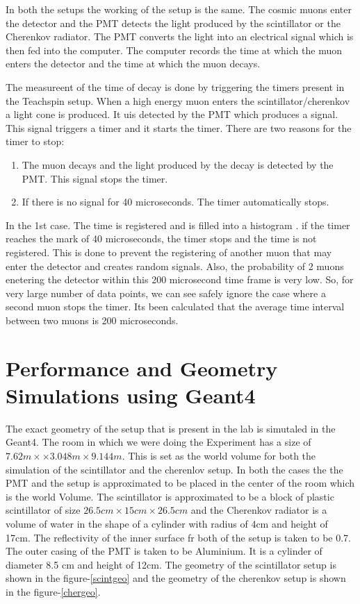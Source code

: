 \documentclass{article}
\begin{document}
\begin{multicols}{2}
In both the setups the working of the setup is the same. The cosmic muons enter the detector and the PMT detects the light produced by the scintillator or the Cherenkov radiator. The PMT converts the light into an electrical signal which is then fed into the computer. The computer records the time at which the muon enters the detector and the time at which the muon decays.

The measureent of the time of decay is done by triggering the timers present in the Teachspin setup. When a high energy muon enters the scintillator/cherenkov a light cone is produced. It uis detected by the PMT which produces a signal. This signal triggers a timer and it starts the timer. There are two reasons for the timer to stop:
\begin{enumerate}
    \item The muon decays and the light produced by the decay is detected by the PMT. This signal stops the timer.
    \item If there is no signal for 40 microseconds. The timer automatically stops.
\end{enumerate}

In the 1st case. The time is registered and is filled into a histogram . if the timer reaches the mark of 40 microseconds, the timer stops and the time is not registered. This is done to prevent the registering of another muon that may enter the detector and creates random signals.
Also, the probability of 2 muons enetering the detector within this 200 microsecond time frame is very low. So, for very large number of data points, we can see safely ignore the case where a second muon stops the timer. Its been calculated that the average time interval between two muons is 200 microseconds.

\section{\label{simobs}Performance and Geometry Simulations using Geant4}

The exact geometry of the setup that is present in the lab is simutaled in the Geant4. The room in which we were doing the Experiment has a size of $7.62m\times\times 3.048m \times 9.144m$. This is set as the world volume for both the simulation of the scintillator and the cherenlov setup. In both the cases the the PMT and the setup is approximated to be placed in the center of the room which is the world Volume. The scintillator is approximated to be a block of plastic scintillator of size $26.5cm \times 15cm \times 26.5cm$ and the Cherenkov radiator is a volume of water in the shape of a cylinder with radius of 4cm and height of 17cm. The reflectivity of the inner surface fr both of the setup is taken to be 0.7. The outer casing of the PMT is taken to be Aluminium. It is a cylinder of diameter 8.5 cm and height of 12cm. The geometry of the scintillator setup is shown in the figure-\ref{scintgeo} and the geometry of the cherenkov setup is shown in the figure-\ref{chergeo}.



\end{multicols}
\end{document}
